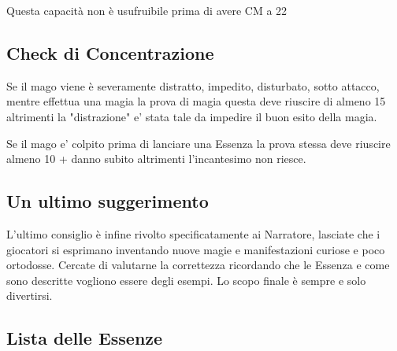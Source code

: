 \documentclass[a4paper,11pt,twoside,openany]{book}
\begin{document}
Questa capacità non è usufruibile prima di avere CM a 22

\subsection{Check di Concentrazione}

Se il mago viene è severamente distratto, impedito, disturbato, sotto attacco, mentre effettua una magia la prova di magia questa deve riuscire di almeno 15 altrimenti la "distrazione" e' stata tale da impedire il buon esito della magia.

Se il mago e' colpito prima di lanciare una Essenza la prova stessa deve riuscire almeno 10 + danno subito altrimenti l'incantesimo non riesce.

\subsection{Un ultimo suggerimento}

L'ultimo consiglio è infine rivolto specificatamente ai Narratore, lasciate che i giocatori si esprimano inventando nuove magie e manifestazioni curiose e poco ortodosse. Cercate di valutarne la correttezza ricordando che le Essenza e come sono descritte vogliono essere degli esempi. Lo scopo finale è sempre e solo divertirsi.

\subsection{Lista delle Essenze}
\end{document}
